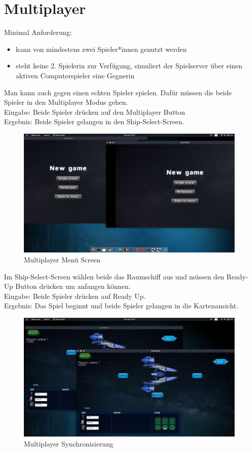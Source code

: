 \documentclass[12pt]{article}
\begin{document}
\section{Multiplayer}
Minimal Anforderung:
\begin{itemize}
\item kann von mindestens zwei Spieler*innen genutzt werden
\item steht keine 2. Spielerin zur Verfügung, simuliert der Spielserver über einen aktiven Computerspieler eine Gegnerin
\end{itemize}
Man kann auch gegen einen echten Spieler spielen. Dafür müssen die beide Spieler in den Multiplayer Modus gehen.\\
Eingabe: Beide Spieler drücken auf den Multiplayer Button\\
Ergebnis: Beide Spieler gelangen in den Ship-Select-Screen.\\
\begin{figure}[htp]
	\centering
	\includegraphics[scale=0.4]{TestProtocolBilder/Multiplayer/1.jpg}
	\caption{Multiplayer Menü Screen}
\end{figure}
\clearpage
Im Ship-Select-Screen wählen beide das Raumschiff aus und müssen den Ready-Up Button drücken um anfangen können.\\
Eingabe: Beide Spieler drücken auf Ready Up.\\
Ergebnis: Das Spiel beginnt und beide Spieler gelangen in die Kartenansicht.\\
\begin{figure}[htp]
	\centering
	\includegraphics[scale=0.4]{TestProtocolBilder/Multiplayer/2.jpg}
	\caption{Multiplayer Synchronisierung}
\end{figure}
\end{document}
